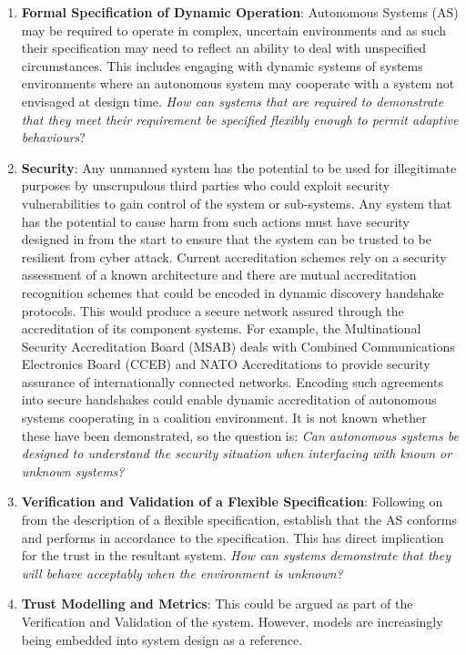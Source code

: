 \begin{enumerate}
  \item \textbf{Formal Specification of Dynamic Operation}: Autonomous Systems (AS) may be required to operate in complex, uncertain environments and as such their specification may need to reflect an ability to deal with unspecified circumstances.
    This includes engaging with dynamic systems of systems environments where an autonomous system may cooperate with a system not envisaged at design time.
    \textit{How can systems that are required to demonstrate that they meet their requirement be specified flexibly enough to permit adaptive behaviours}?
  \item \textbf{Security}: Any unmanned system has the potential to be used for illegitimate purposes by unscrupulous third parties who could exploit security vulnerabilities to gain control of the system or sub-systems.
    Any system that has the potential to cause harm from such actions must have security designed in from the start to ensure that the system can be trusted to be resilient from cyber attack.
    Current accreditation schemes rely on a security assessment of a known architecture and there are mutual accreditation recognition schemes that could be encoded in dynamic discovery handshake protocols.
    This would produce a secure network assured through the accreditation of its component systems.
    For example, the Multinational Security Accreditation Board (MSAB) deals with Combined Communications Electronics Board (CCEB) and NATO Accreditations to provide security assurance of internationally connected networks.
    Encoding such agreements into secure handshakes could enable dynamic accreditation of autonomous systems cooperating in a coalition environment.
    It is not known whether these have been demonstrated, so the question is: \textit{Can autonomous systems be designed to understand the security situation when interfacing with known or unknown systems?}
  \item \textbf{Verification and Validation of a Flexible Specification}: Following on from the description of a flexible specification, establish that the AS conforms and performs in accordance to the specification.
    This has direct implication for the trust in the resultant system.
    \emph{How can systems demonstrate that they will behave acceptably when the environment is unknown?}
  \item \textbf{Trust Modelling and Metrics}: This could be argued as part of the Verification and Validation of the system.
    However, models are increasingly being embedded into system design as a reference.

\end{enumerate}
